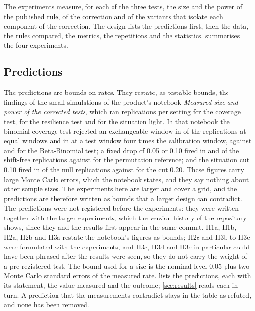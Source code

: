 The experiments measure, for each of the three tests, the size and the power of the published rule, of the correction and of the variants that isolate each component of the correction. The design lists the predictions first, then the data, the rules compared, the metrics, the repetitions and the statistics.  summarises the four experiments.



\subsection{Predictions}

The predictions are bounds on rates. They restate, as testable bounds, the findings of the small simulations of the product's notebook \emph{Measured size and power of the corrected tests}, which ran \NbCovReps{} replications per setting for the coverage test, \NbShiftReps{} for the resilience test and \NbSitReps{} for the situation light. In that notebook the binomial coverage test rejected an exchangeable window in \NbBinOne{} of the replications at equal windows and in \NbBinFour{} at a test window four times the calibration window, against \NbBBOne{} and \NbBBFour{} for the Beta-Binomial test; a fixed drop of 0.05 or 0.10 fired in \NbFixedFiveZ{} and \NbFixedTenZ{} of the shift-free replications against \NbPermZ{} for the permutation reference; and the situation cut 0.10 fired in \NbSitCutTenZ{} of the null replications against \NbSitCutTwentyZ{} for the cut 0.20. Those figures carry large Monte Carlo errors, which the notebook states, and they say nothing about other sample sizes. The experiments here are larger and cover a grid, and the predictions are therefore written as bounds that a larger design can contradict. The predictions were not registered before the experiments: they were written together with the larger experiments, which the version history of the repository shows, since they and the results first appear in the same commit. H1a, H1b, H2a, H2b and H3a restate the notebook's figures as bounds; H2c and H3b to H3e were formulated with the experiments, and H3c, H3d and H3e in particular could have been phrased after the results were seen, so they do not carry the weight of a pre-registered test. The bound used for a size is the nominal level 0.05 plus two Monte Carlo standard errors of the measured rate.  lists the \HypTotal{} predictions, each with its statement, the value measured and the outcome; \cref{sec:results} reads each in turn. A prediction that the measurements contradict stays in the table as refuted, and none has been removed.

